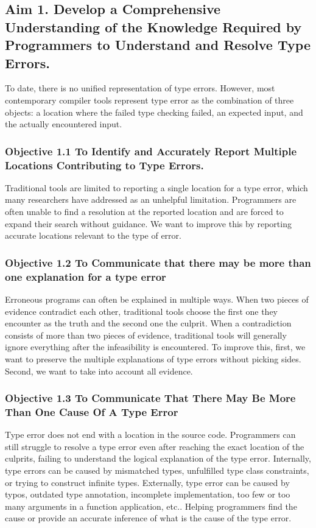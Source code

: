 \subsection{Aim 1. Develop a Comprehensive Understanding of the Knowledge Required by Programmers to Understand and Resolve Type Errors.}

To date, there is no unified representation of type errors. However, most contemporary compiler tools represent type error as the combination of three objects: a location where the failed type checking failed, an expected input, and the actually encountered input.

\subsubsection{Objective 1.1 To Identify and Accurately Report Multiple Locations Contributing to Type Errors.}

Traditional tools are limited to reporting a single location for a type error, which many researchers have addressed as an unhelpful limitation. Programmers are often unable to find a resolution at the reported location and are forced to expand their search without guidance. We want to improve this by reporting accurate locations relevant to the type of error.

\subsubsection{Objective 1.2 To Communicate that there may be more than one explanation for a type error}

Erroneous programs can often be explained in multiple ways. When two pieces of evidence contradict each other, traditional tools choose the first one they encounter as the truth and the second one the culprit. When a contradiction consists of more than two pieces of evidence, traditional tools will generally ignore everything after the infeasibility is encountered. To improve this, first, we want to preserve the multiple explanations of type errors without picking sides. Second, we want to take into account all evidence.

\subsubsection{Objective 1.3 To Communicate That There May Be More Than One Cause Of A Type Error}

Type error does not end with a location in the source code. Programmers can still struggle to resolve a type error even after reaching the exact location of the culprits, failing to understand the logical explanation of the type error. Internally, type errors can be caused by mismatched types, unfulfilled type class constraints, or trying to construct infinite types. Externally, type error can be caused by typos, outdated type annotation, incomplete implementation, too few or too many arguments in a function application, etc.. Helping programmers find the cause or provide an accurate inference of what is the cause of the type error.

